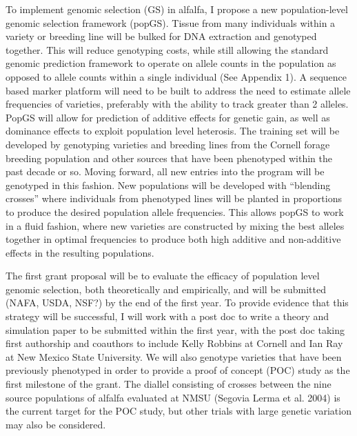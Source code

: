 \documentclass[10pt]{article}
\begin{document}
To implement genomic selection (GS) in alfalfa, I propose a new population-level genomic selection framework (popGS). Tissue from many individuals within a variety or breeding line will be bulked for DNA extraction and genotyped together. This will reduce genotyping costs, while still allowing the standard genomic prediction framework to operate on allele counts in the population as opposed to allele counts within a single individual (See Appendix 1). A sequence based marker platform will need to be built to address the need to estimate allele frequencies of varieties, preferably with the ability to track greater than 2 alleles. PopGS will allow for prediction of additive effects for genetic gain, as well as dominance effects to exploit population level heterosis. The training set will be developed by genotyping varieties and breeding lines from the Cornell forage breeding population and other sources that have been phenotyped within the past decade or so. Moving forward, all new entries into the program will be genotyped in this fashion. New populations will be developed with ``blending crosses'' where individuals from phenotyped lines will be planted in proportions to produce the desired population allele frequencies. This allows popGS to work in a fluid fashion, where new varieties are constructed by mixing the best alleles together in optimal frequencies to produce both high additive and non-additive effects in the resulting populations. 



The first grant proposal will be to evaluate the efficacy of population level genomic selection, both theoretically and empirically, and will be submitted (NAFA, USDA, NSF?) by the end of the first year. To provide evidence that this strategy will be successful, I will work with a post doc to write a theory and simulation paper to be submitted within the first year, with the post doc taking first authorship and coauthors to include Kelly Robbins at Cornell and Ian Ray at New Mexico State University. We will also genotype varieties that have been previously phenotyped in order to provide a proof of concept (POC) study as the first milestone of the grant. The diallel consisting of crosses between the nine source populations of alfalfa evaluated at NMSU (Segovia Lerma et al. 2004) is the current target for the POC study, but other trials with large genetic variation may also be considered.
\end{document}
